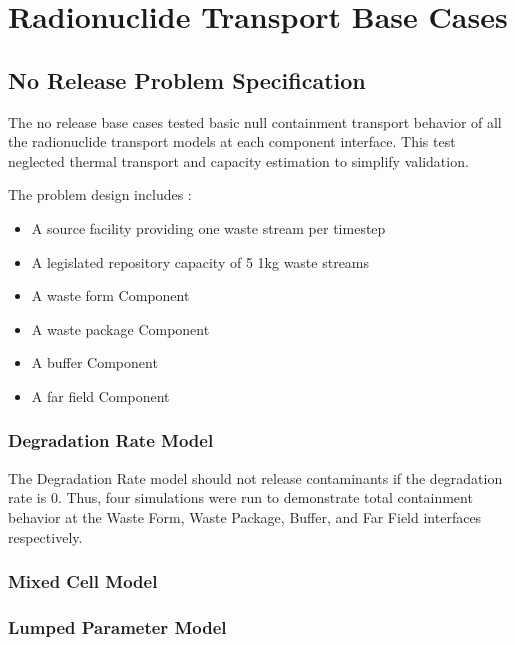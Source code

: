 \section{Radionuclide Transport Base Cases}\label{sec:nuclide_base_cases}
\subsection{No Release Problem Specification}
The no release base cases tested basic null containment transport behavior of 
all the radionuclide transport models at each component interface. This test 
neglected thermal transport and capacity estimation to simplify validation. 

The problem design includes : 
\begin{itemize}
\item{A source facility providing one waste stream per timestep}
\item{A legislated repository capacity of 5 1kg waste streams}
\item{A waste form Component} 
\item{A waste package Component}
\item{A buffer Component}
\item{A far field Component}
\end{itemize}

\subsubsection{Degradation Rate Model}
The Degradation Rate model should not release contaminants if the degradation 
rate is 0. Thus, four simulations were run to demonstrate total containment 
behavior at the Waste Form, Waste Package, Buffer, and Far Field interfaces 
respectively. 



\clearpage

\subsubsection{Mixed Cell Model}



\clearpage

\subsubsection{Lumped Parameter Model}

